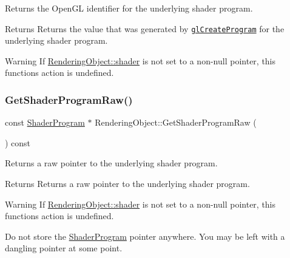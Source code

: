 Returns the Open\+GL identifier for the underlying shader program.

\begin{DoxyReturn}{Returns}
Returns the value that was generated by \href{https://www.opengl.org/sdk/docs/man/html/glCreateProgram.xhtml}{\tt gl\+Create\+Program} for the underlying shader program.
\end{DoxyReturn}
\begin{DoxyWarning}{Warning}
If \hyperlink{class_rendering_object_ae50e545ce2008ffa802478cd4316e82e}{Rendering\+Object\+::shader} is not set to a non-\/null pointer, this function\textquotesingle{}s action is undefined.
\end{DoxyWarning}
\hypertarget{class_rendering_object_ab32a982b996ebaca66f4f8b9f4e548b2}{}\label{class_rendering_object_ab32a982b996ebaca66f4f8b9f4e548b2}
\subsubsection{\texorpdfstring{Get\+Shader\+Program\+Raw()}{GetShaderProgramRaw()}}
{\footnotesize\ttfamily const \hyperlink{class_shader_program}{Shader\+Program} $\ast$ Rendering\+Object\+::\+Get\+Shader\+Program\+Raw (\begin{DoxyParamCaption}{ }\end{DoxyParamCaption}) const}



Returns a raw pointer to the underlying shader program.

\begin{DoxyReturn}{Returns}
Returns a raw pointer to the underlying shader program.
\end{DoxyReturn}
\begin{DoxyWarning}{Warning}
If \hyperlink{class_rendering_object_ae50e545ce2008ffa802478cd4316e82e}{Rendering\+Object\+::shader} is not set to a non-\/null pointer, this function\textquotesingle{}s action is undefined.

Do not store the \hyperlink{class_shader_program}{Shader\+Program} pointer anywhere. You may be left with a dangling pointer at some point.
\end{DoxyWarning}
\hypertarget{class_rendering_object_af83dd72431c620145b06d2e1bf7a9f3e}{}\label{class_rendering_object_af83dd72431c620145b06d2e1bf7a9f3e}
